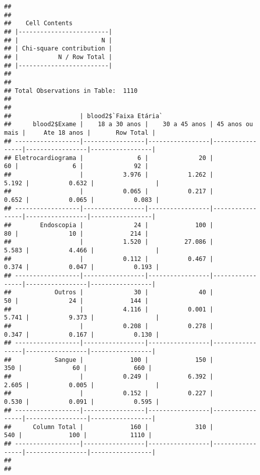 \documentclass[
]{article}
\begin{document}
\begin{verbatim}
## 
##  
##    Cell Contents
## |-------------------------|
## |                       N |
## | Chi-square contribution |
## |           N / Row Total |
## |-------------------------|
## 
##  
## Total Observations in Table:  1110 
## 
##  
##                   | blood2$`Faixa Etária` 
##      blood2$Exame |    18 a 30 anos |    30 a 45 anos | 45 anos ou mais |     Ate 18 anos |       Row Total | 
## ------------------|-----------------|-----------------|-----------------|-----------------|-----------------|
## Eletrocardiograma |               6 |              20 |              60 |               6 |              92 | 
##                   |           3.976 |           1.262 |           5.192 |           0.632 |                 | 
##                   |           0.065 |           0.217 |           0.652 |           0.065 |           0.083 | 
## ------------------|-----------------|-----------------|-----------------|-----------------|-----------------|
##        Endoscopia |              24 |             100 |              80 |              10 |             214 | 
##                   |           1.520 |          27.086 |           5.583 |           4.466 |                 | 
##                   |           0.112 |           0.467 |           0.374 |           0.047 |           0.193 | 
## ------------------|-----------------|-----------------|-----------------|-----------------|-----------------|
##            Outros |              30 |              40 |              50 |              24 |             144 | 
##                   |           4.116 |           0.001 |           5.741 |           9.373 |                 | 
##                   |           0.208 |           0.278 |           0.347 |           0.167 |           0.130 | 
## ------------------|-----------------|-----------------|-----------------|-----------------|-----------------|
##            Sangue |             100 |             150 |             350 |              60 |             660 | 
##                   |           0.249 |           6.392 |           2.605 |           0.005 |                 | 
##                   |           0.152 |           0.227 |           0.530 |           0.091 |           0.595 | 
## ------------------|-----------------|-----------------|-----------------|-----------------|-----------------|
##      Column Total |             160 |             310 |             540 |             100 |            1110 | 
## ------------------|-----------------|-----------------|-----------------|-----------------|-----------------|
## 
## 
\end{verbatim}
\end{document}
